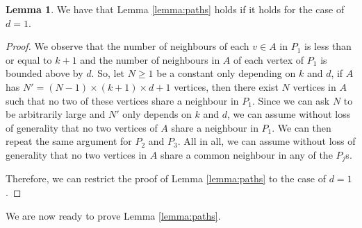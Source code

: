 \documentclass[12pt]{article}
\theoremstyle{definition}
\newtheorem{lemma}[thm]{Lemma}
\begin{document}
    \begin{lemma} \label{lemma:done}
        We have that Lemma \ref{lemma:paths}
        holds if it holds for the case of $d = 1$.
    \end{lemma}
    \begin{proof}
        We observe that the number
        of neighbours of each $v \in A$ 
        in $P_1$ is less than or equal
        to $k+1$ and the number of
        neighbours in $A$ of each vertex of
        $P_1$ is bounded above by $d$.
        So, let $N \geq 1$ be a constant only depending
        on $k$ and $d$,
        if $A$ has $N' = \left(N-1\right)
        \times \left(k+1\right) \times 
        d + 1$ vertices, then there
        exist $N$ vertices in $A$ 
        such that no two of these
        vertices share a neighbour
        in $P_1$. Since we can ask
        $N$ to be arbitrarily large and
        $N'$ only depends on $k$ and $d$, we can assume
        without loss of generality that
        no two vertices of $A$ share a
        neighbour in $P_1$.
        We can then repeat the same argument
        for $P_2$ and $P_3$. All in all,
        we can assume without loss of
        generality that no two vertices in $A$ share a
        common neighbour in any of the $P_{j}$s.
        
        Therefore, we can restrict the proof
        of Lemma \ref{lemma:paths} to the
        case of $d = 1$. 
    \end{proof}
    
    We are now ready to prove Lemma \ref{lemma:paths}.
\end{document}
